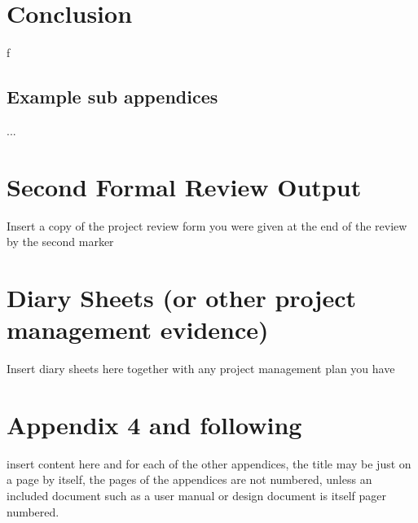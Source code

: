 \documentclass[12pt,a4paper]{article}
\begin{document}
\section{Conclusion}
f



\newpage
\begin{appendices}
\begin{minipage}{\textwidth}
	
\end{minipage}

\begin{subappendices}

\subsection{Example sub appendices}
...
\end{subappendices}

\section{Second Formal Review Output}
Insert a copy of the project review form you were given at the end of the review by the second marker

\section{Diary Sheets (or other project management evidence)}
Insert diary sheets here together with any project management plan you have

\section{Appendix 4 and following}
insert content here and for each of the other appendices, the title may be just on a page by itself, the pages of the appendices are not numbered, unless an included document such as a user manual or design document is itself pager numbered.
\end{appendices}
\end{document}
